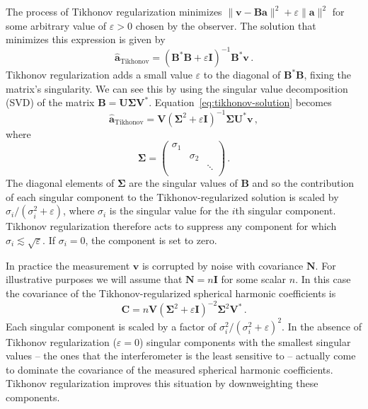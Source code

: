 \documentclass[twocolumn]{aastex6}
\renewcommand{\b}{\pmb}
\newcommand{\atikh}{\b{\hat a}_\text{Tikhonov}}
\begin{document}
The process of Tikhonov regularization minimizes $\|\b v - \b B\b a\|^2 + \varepsilon\|\b a\|^2$ for
some arbitrary value of $\varepsilon > 0$ chosen by the observer. The solution that minimizes this
expression is given by
\begin{equation}\label{eq:tikhonov-solution}
    \atikh = (\b B^*\b B + \varepsilon\b I)^{-1}\b B^*\b v\,.
\end{equation}
Tikhonov regularization adds a small value $\varepsilon$ to the diagonal of $\b B^*\b B$, fixing the
matrix's singularity. We can see this by using the singular value decomposition (SVD) of the matrix
$\b B = \b U \b \Sigma \b V^*$. Equation~\ref{eq:tikhonov-solution} becomes
\begin{equation}
    \atikh = \b V (\b\Sigma^2 + \varepsilon \b I)^{-1}\b\Sigma \b U^*\b v\,,
\end{equation}
where
\[
    \b\Sigma = \left(
        \begin{array}{ccc}
            \sigma_1 & & \\
                     & \sigma_2 & \\
                     & & \ddots \\
        \end{array}
    \right)\,.
\]
The diagonal elements of $\b\Sigma$ are the singular values of $\b B$ and so the contribution of
each singular component to the Tikhonov-regularized solution is scaled by $\sigma_i / (\sigma_i^2 +
\varepsilon)$, where $\sigma_i$ is the singular value for the $i$th singular component. Tikhonov
regularization therefore acts to suppress any component for which
$\sigma_i\lesssim\sqrt{\varepsilon}$.  If $\sigma_i = 0$, the component is set to zero.

In practice the measurement $\b v$ is corrupted by noise with covariance $\b N$. For illustrative
purposes we will assume that $\b N=n\b I$ for some scalar $n$. In this case the covariance of the
Tikhonov-regularized spherical harmonic coefficients is
\begin{equation}
    \b C = n \b V (\b\Sigma^2 + \varepsilon\b I)^{-2} \b\Sigma^2 \b V^*\,.
\end{equation}
Each singular component is scaled by a factor of $\sigma_i^2/(\sigma_i^2 + \varepsilon)^2$.  In the
absence of Tikhonov regularization ($\varepsilon=0$) singular components with the smallest singular
values -- the ones that the interferometer is the least sensitive to -- actually come to dominate
the covariance of the measured spherical harmonic coefficients. Tikhonov regularization improves
this situation by downweighting these components.
\end{document}
